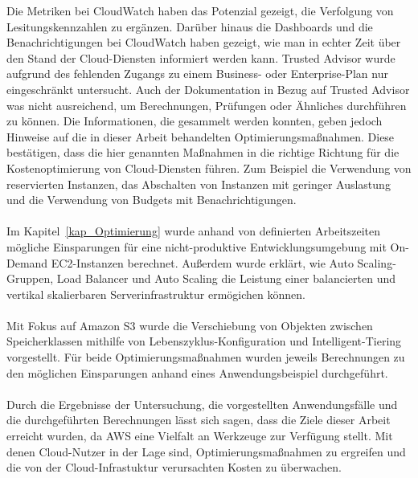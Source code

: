 %
Die Metriken bei CloudWatch haben das Potenzial gezeigt, die Verfolgung von Lesitungskennzahlen zu ergänzen. Darüber hinaus die Dashboards und die Benachrichtigungen bei CloudWatch haben gezeigt, wie man in echter Zeit über den Stand der Cloud-Diensten informiert werden kann.
%
Trusted Advisor wurde aufgrund des fehlenden Zugangs zu einem Business- oder Enterprise-Plan nur eingeschränkt untersucht. 
Auch der Dokumentation in Bezug auf Trusted Advisor was nicht ausreichend, um Berechnungen, Prüfungen oder Ähnliches durchführen zu können. Die Informationen, die gesammelt werden konnten, geben jedoch Hinweise auf die in dieser Arbeit behandelten Optimierungsmaßnahmen. Diese bestätigen, dass die hier genannten Maßnahmen in die richtige Richtung für die Kostenoptimierung von Cloud-Diensten führen. Zum Beispiel die Verwendung von reservierten Instanzen, das Abschalten von Instanzen mit geringer Auslastung und die Verwendung von Budgets mit Benachrichtigungen.
\\\\
Im Kapitel~\ref{kap_Optimierung} wurde anhand von definierten Arbeitszeiten mögliche Einsparungen für eine nicht-produktive Entwicklungsumgebung mit On-Demand EC2-Instanzen berechnet. Außerdem wurde erklärt, wie Auto Scaling-Gruppen, Load Balancer und Auto Scaling die Leistung einer balancierten und vertikal skalierbaren Serverinfrastruktur ermögichen können.
\\\\
Mit Fokus auf Amazon S3 wurde die Verschiebung von Objekten zwischen Speicherklassen mithilfe von Lebenszyklus-Konfiguration und Intelligent-Tiering vorgestellt. Für beide Optimierungsmaßnahmen wurden jeweils Berechnungen zu den möglichen Einsparungen anhand eines Anwendungsbeispiel durchgeführt.
\\\\
Durch die Ergebnisse der Untersuchung, die vorgestellten Anwendungsfälle und die durchgeführten Berechnungen lässt sich sagen, dass die Ziele dieser Arbeit erreicht wurden, da AWS eine Vielfalt an Werkzeuge zur Verfügung stellt. Mit denen Cloud-Nutzer in der Lage sind, Optimierungsmaßnahmen zu ergreifen und die von der Cloud-Infrastuktur verursachten Kosten zu überwachen.
\\\\
